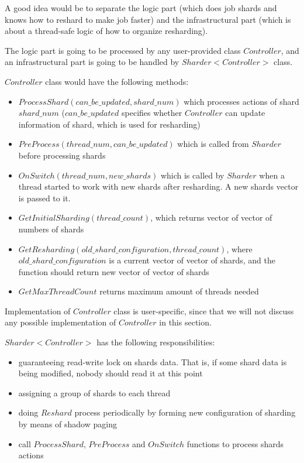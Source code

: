\documentclass{article}
\begin{document}
A good idea would be to separate the logic part (which does job shards and knows how to reshard to make job faster) and the infrastructural part (which is about a thread-safe logic of how to organize resharding).

The logic part is going to be processed by any user-provided class $Controller$, and an infrastructural part is going to be handled by $Sharder<Controller>$ class.

$Controller$ class would have the following methods:
\begin{itemize}
	\item $ProcessShard(can\_be\_updated, shard\_num)$ which processes actions of shard $shard\_num$ ($can\_be\_updated$ specifies whether $Controller$ can update information of shard, which is used for resharding)
	\item $PreProcess(thread\_num, can\_be\_updated)$ which is called from $Sharder$ before processing shards
	\item $OnSwitch(thread\_num, new\_shards)$ which is called by $Sharder$ when a thread started to work with new shards after resharding. A new shards vector is passed to it.
	\item $GetInitialSharding(thread\_count)$, which returns vector of vector of numbers of shards
	\item $GetResharding(old\_shard\_configuration, thread\_count)$, where $old\_shard\_configuration$ is a current vector of vector of shards, and the function should return new vector of vector of shards
	\item $GetMaxThreadCount$ returns maximum amount of threads needed
\end{itemize}

Implementation of $Controller$ class is user-specific, since that we will not discuss any possible implementation of $Controller$ in this section.

$Sharder<Controller>$ has the following responsibilities:
\begin{itemize}
	\item guaranteeing read-write lock on shards data. That is, if some shard data is being modified, nobody should read it at this point
	\item assigning a group of shards to each thread
	\item doing $Reshard$ process periodically by forming new configuration of sharding by means of shadow paging
	\item call $ProcessShard$, $PreProcess$ and $OnSwitch$ functions to process shards actions
\end{itemize}
\end{document}
